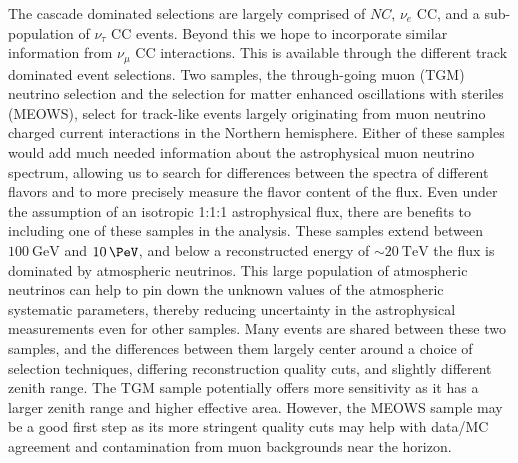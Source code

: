 The cascade dominated selections are largely comprised of $NC$, $\nu_e$ CC, and a sub-population of $\nu_\tau$ CC events.
Beyond this we hope to incorporate similar information from $\nu_\mu$ CC interactions.
This is available through the different track dominated event selections.
Two samples, the through-going muon (TGM) neutrino selection and the selection for matter enhanced oscillations with steriles (MEOWS), select for track-like events largely originating from muon neutrino charged current interactions in the Northern hemisphere.
Either of these samples would add much needed information about the astrophysical muon neutrino spectrum, allowing us to search for differences between the spectra of different flavors and to more precisely measure the flavor content of the flux.
Even under the assumption of an isotropic 1:1:1 astrophysical flux, there are benefits to including one of these samples in the analysis.
These samples extend between $\SI{100}\GeV$ and $\SI{10}\PeV$, and below a reconstructed energy of $\sim\SI{20}\TeV$ the flux is dominated by atmospheric neutrinos.
This large population of atmospheric neutrinos can help to pin down the unknown values of the atmospheric systematic parameters, thereby reducing uncertainty in the astrophysical measurements even for other samples.
Many events are shared between these two samples, and the differences between them largely center around a choice of selection techniques, differing reconstruction quality cuts, and slightly different zenith range.
The TGM sample potentially offers more sensitivity as it has a larger zenith range and higher effective area.
However, the MEOWS sample may be a good first step as its more stringent quality cuts may help with data/MC agreement and contamination from muon backgrounds near the horizon.

